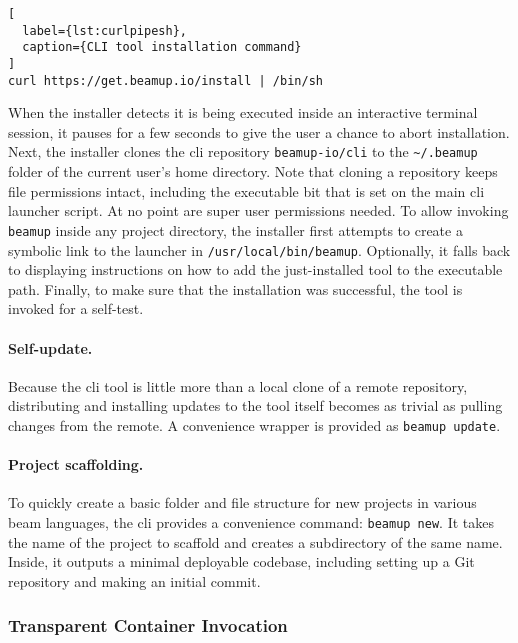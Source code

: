 \begin{lstlisting}[
  label={lst:curlpipesh},
  caption={CLI tool installation command}
]
curl https://get.beamup.io/install | /bin/sh
\end{lstlisting}

When the installer detects it is being executed inside an interactive terminal session, it pauses for a few seconds to give the user a chance to abort installation. Next, the installer clones the \acrshort{cli} repository \lstinline|beamup-io/cli| to the \lstinline|~/.beamup| folder of the current user's home directory. Note that cloning a repository keeps file permissions intact, including the executable bit that is set on the main \acrshort{cli} launcher script. At no point are super user permissions needed. To allow invoking \lstinline|beamup| inside any project directory, the installer first attempts to create a symbolic link to the launcher in \lstinline|/usr/local/bin/beamup|. Optionally, it falls back to displaying instructions on how to add the just-installed tool to the executable path. Finally, to make sure that the installation was successful, the tool is invoked for a self-test.

\paragraph{Self-update.} Because the \acrshort{cli} tool is little more than a local clone of a remote repository, distributing and installing updates to the tool itself becomes as trivial as pulling changes from the remote. A convenience wrapper is provided as \lstinline|beamup update|.

\paragraph{Project scaffolding.} To quickly create a basic folder and file structure for new projects in various \acrshort{beam} languages, the \acrshort{cli} provides a convenience command: \lstinline|beamup new|. It takes the name of the project to scaffold and creates a subdirectory of the same name. Inside, it outputs a minimal deployable codebase, including setting up a Git repository and making an initial commit.

\subsubsection{Transparent Container Invocation}

